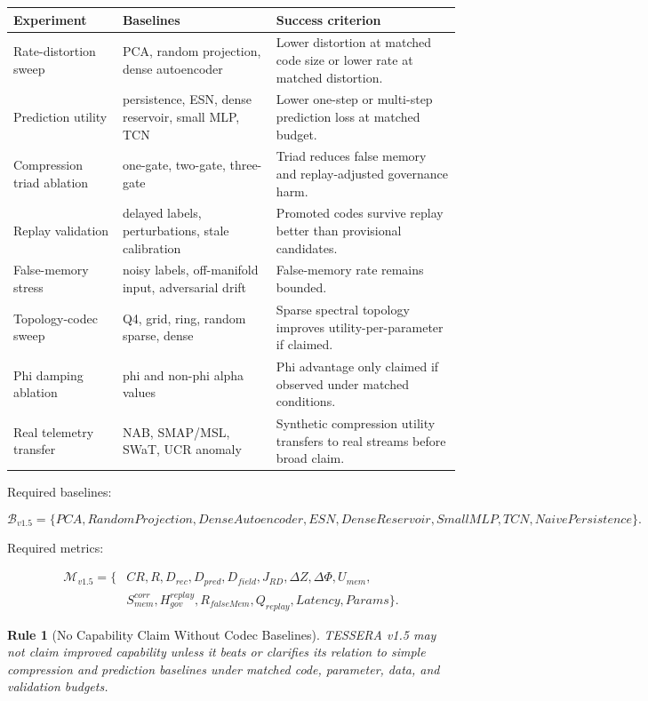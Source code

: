 \documentclass[12pt]{article}
\newtheorem{rulebox}{Rule}
\begin{document}
\begin{longtable}{p{}p{}p{}}
\toprule
\textbf{Experiment} & \textbf{Baselines} & \textbf{Success criterion} \\
\midrule
Rate-distortion sweep & PCA, random projection, dense autoencoder & Lower distortion at matched code size or lower rate at matched distortion. \\
Prediction utility & persistence, ESN, dense reservoir, small MLP, TCN & Lower one-step or multi-step prediction loss at matched budget. \\
Compression triad ablation & one-gate, two-gate, three-gate & Triad reduces false memory and replay-adjusted governance harm. \\
Replay validation & delayed labels, perturbations, stale calibration & Promoted codes survive replay better than provisional candidates. \\
False-memory stress & noisy labels, off-manifold input, adversarial drift & False-memory rate remains bounded. \\
Topology-codec sweep & Q4, grid, ring, random sparse, dense & Sparse spectral topology improves utility-per-parameter if claimed. \\
Phi damping ablation & phi and non-phi alpha values & Phi advantage only claimed if observed under matched conditions. \\
Real telemetry transfer & NAB, SMAP/MSL, SWaT, UCR anomaly & Synthetic compression utility transfers to real streams before broad claim. \\
\bottomrule
\end{longtable}

Required baselines:

\[
\mathcal{B}_{v1.5}=\{PCA,RandomProjection,DenseAutoencoder,ESN,DenseReservoir,SmallMLP,TCN,NaivePersistence\}.
\]

Required metrics:

\[
\begin{aligned}
\mathcal{M}_{v1.5}=\{&CR,R,D_{rec},D_{pred},D_{field},J_{RD},\Delta Z,
\Delta\Phi,U_{mem},\\
&S_{mem}^{corr},H_{gov}^{replay},R_{falseMem},Q_{replay},Latency,Params\}.
\end{aligned}
\]

\begin{rulebox}[No Capability Claim Without Codec Baselines]
TESSERA v1.5 may not claim improved capability unless it beats or clarifies its
relation to simple compression and prediction baselines under matched code,
parameter, data, and validation budgets.
\end{rulebox}
\end{document}
